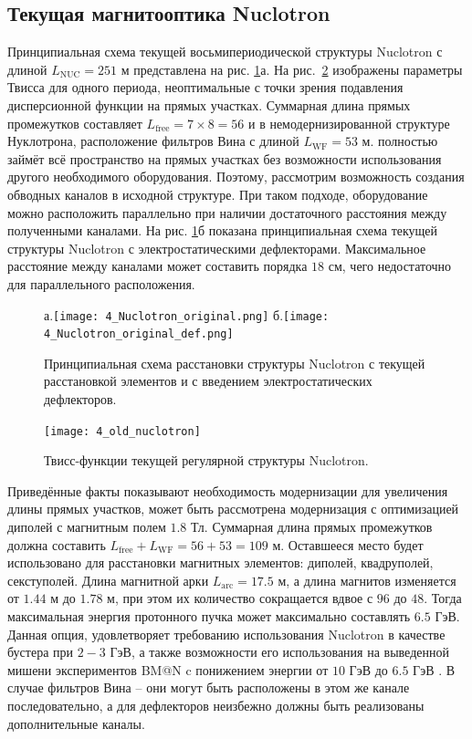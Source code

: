 	\subsection{Текущая магнитооптика Nuclotron}\label{sec:EDM/optics}
\par Принципиальная схема текущей восьмипериодической структуры Nuclotron с длиной $L_{\text{NUC}}=251$ м представлена на рис. \ref{fig:4_Nuclotron_original}а. На рис.~\ref{fig:4_old_nuclotron} изображены параметры Твисса для одного периода, неоптимальные с точки зрения подавления дисперсионной функции на прямых участках. Суммарная длина прямых промежутков составляет $L_{\text{free}} = 7\times8=56$ и в немодернизированной структуре Нуклотрона, расположение фильтров Вина с длиной $L_{\text{WF}} = 53$ м. полностью займёт всё пространство на прямых участках без возможности использования другого необходимого оборудования. Поэтому, рассмотрим возможность создания обводных каналов в исходной структуре. При таком подходе, оборудование можно расположить параллельно при наличии достаточного расстояния между полученными каналами. На рис. \ref{fig:4_Nuclotron_original}б показана принципиальная схема текущей структуры Nuclotron с электростатическими дефлекторами. Максимальное расстояние между каналами может составить порядка $18$ см, чего недостаточно для параллельного расположения.

\begin{figure}[!h]
	\centering
	а.\texttt{[image: 4\_Nuclotron\_original.png]}
	б.\texttt{[image: 4\_Nuclotron\_original\_def.png]}
	\caption{Принципиальная схема расстановки структуры Nuclotron с текущей расстановкой элементов и с введением электростатических дефлекторов.}
	\label{fig:4_Nuclotron_original}
\end{figure}

\begin{figure}[!h]
  \centering
	\texttt{[image: 4\_old\_nuclotron]}
   \caption{Твисс-функции текущей регулярной структуры Nuclotron.}
   \label{fig:4_old_nuclotron}
\end{figure}

\par Приведённые факты показывают необходимость модернизации для увеличения длины прямых участков, может быть рассмотрена модернизация с оптимизацией диполей с магнитным полем $1.8$ Тл. Суммарная длина прямых промежутков должна составить $L_{\text{free}}+L_{\text{WF}}=56+53 = 109$ м. Оставшееся место будет использовано для расстановки магнитных элементов: диполей, квадруполей, секступолей. Длина магнитной арки $L_{\textrm{arc}}=17.5$ м, а длина магнитов изменяется от $1.44$ м до $1.78$ м, при этом их количество сокращается вдвое с $96$ до $48$. Тогда максимальная энергия протонного пучка может максимально составлять $6.5$ ГэВ. Данная опция, удовлетворяет требованию использования Nuclotron в качестве бустера при $2-3$ ГэВ, а также возможности его использования на выведенной мишени экспериментов BM@N c понижением энергии от $10$ ГэВ до $6.5$ ГэВ \cite{kovalenko:nuclotron}. В случае фильтров Вина – они могут быть расположены в этом же канале последовательно, а для дефлекторов неизбежно должны быть реализованы дополнительные каналы.

